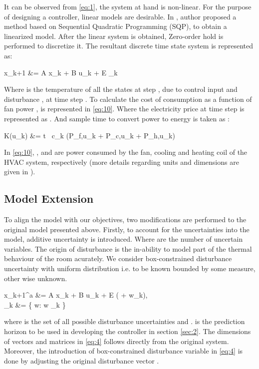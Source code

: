 \documentclass[conference,10pt]{IEEEtran}
\newcommand{\norm}[1]{\left\lVert#1\right\rVert}
\begin{document}
It can be observed from \eqref{eq:1}, the system at hand is non-linear. For the purpose of designing a controller, linear models are desirable. In \cite{Mehdi1}, author proposed a method based on Sequential Quadratic Programming (SQP), to obtain a linearized model. After the linear system is obtained, Zero-order hold is performed to discretize it. The resultant discrete time state system is represented as:

x_{k+1} &= A x_k + B u_k + E _k



Where  is the temperature of all the states at step , due to control input  and disturbance , at time step . To calculate the cost of consumption as a function of fan power ,  is represented in \eqref{eq:10}. Where the electricity price at time step  is represented as . And sample time to convert power to energy is taken as :

K\left(u_k\right)  &=  \Delta t \ c_k \left(P_{f,u_k} + P_{c,u_k} + P_{h,u_k}\right)
 


In \eqref{eq:10}, ,  and  are power consumed by the fan, cooling and heating coil of the HVAC system, respectively (more details regarding units and dimensions are given in \cite{Mehdi1, Mehdi2, Mehdi3}). 
\subsection{Model Extension}\label{subsec:1_2}
To align the model with our objectives, two modifications are performed to the original model presented above. Firstly, to account for the uncertainties into the model, additive uncertainty    is introduced. Where  are the number of uncertain variables. The origin of disturbance is the in-ability to model part of the thermal behaviour of the room acurately. We consider box-constrained disturbance uncertainty with uniform distribution i.e. to be known bounded by some measure, other wise unknown.

x_{k+1}^{a} &= A x_{k} + B u_{k} + E ( + w_k), \\
_k &= \{ w: \norm{w} \leq \sigma_k \}

where  is the set of all possible disturbance uncertainties  and .  is the prediction horizon to be used in developing the controller in section \ref{sec:2}. The dimensions of vectors and matrices in \eqref{eq:4} follows directly from the original system. Moreover, the introduction of box-constrained disturbance variable  in \eqref{eq:4} is done by adjusting the original disturbance vector .  
\end{document}
